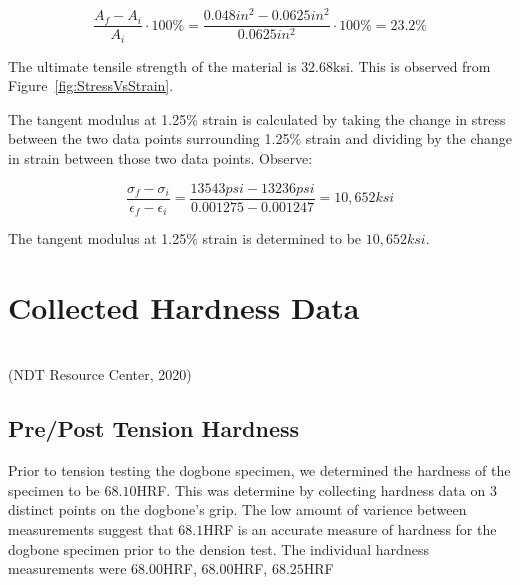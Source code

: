 \documentclass{article}
\begin{document}
\begin{equation}
\frac{A_f - A_i}{A_i}\cdot 100\% = \frac{0.048in^2 - 0.0625in^2}{0.0625in^2}\cdot 100\% = 23.2\%
\label{eq:PercentReduction}
\end{equation}


The ultimate tensile strength of the material is $32.68$ksi. This is observed from Figure~\ref{fig:StressVsStrain}.


The tangent modulus at 1.25\% strain is calculated by taking the change in stress between the two data points surrounding 1.25\% strain and dividing by the change in strain between those two data points. Observe:

\begin{equation}
\frac{\sigma_f - \sigma_i}{\epsilon_f - \epsilon_i} = \frac{13543psi - 13236psi}{0.001275 - 0.001247} = 10,652ksi
\end{equation}

The tangent modulus at 1.25\% strain is determined to be $10,652ksi$.


\section{Collected Hardness Data}

\begin{mdframed}
\begin{center}
\\
(NDT Resource Center, 2020)
\end{center}
\end{mdframed}


\subsection{Pre/Post Tension Hardness}
Prior to tension testing the dogbone specimen, we determined the hardness of the specimen to be $68.10$HRF. This was determine by collecting hardness data on 3 distinct points on the dogbone's grip. The low amount of varience between measurements suggest that $68.1$HRF is an accurate measure of hardness for the dogbone specimen prior to the dension test. The individual hardness measurements were $68.00$HRF, $68.00$HRF, $68.25$HRF
\end{document}
